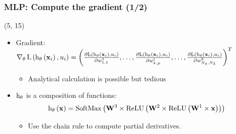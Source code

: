 \begin{frame}
  \frametitle{\acl{MLP}: Compute the gradient (1/2)}

  \begin{textblock}{90}(5, 15)
    \begin{itemize}
    \item Gradient:
      $
      \operatorname{\nabla}_{\mathbf{\theta}} \mathrm{L} \left ( {\mathrm{h}_{\mathbf{\theta}} \left ( {\mathbf{x}_i} \right ), u_i} \right ) =
      \left( \frac{\partial \mathrm{L} \left ( {\mathrm{h}_{\mathbf{\theta}} \left ( {\mathbf{x}_i} \right ), u_i} \right ) }{\partial w_{1,1}^1},\ldots,\frac{\partial \mathrm{L} \left ( {\mathrm{h}_{\mathbf{\theta}} \left ( {\mathbf{x}_i} \right ), u_i} \right ) }{\partial w_{k,p}^l},\ldots,\frac{\partial \mathrm{L} \left ( {\mathrm{h}_{\mathbf{\theta}} \left ( {\mathbf{x}_i} \right ), u_i} \right ) }{\partial w_{N_{4},N_{3}}^{3}} \right)^T
      $

      \begin{itemize}
      \item Analytical calculation is possible but tedious
      \end{itemize}
    \item $\mathrm{h}_{\mathbf{\theta}}$ is a composition of functions:
      \[
        \apply{\hyp_{\params}}{\example} = \apply{\softMaxFunc}{%
          \weightMatrix^3 \times
          \apply{\ReLUFunc}{%
            \weightMatrix^2 \times
            \apply{\ReLUFunc}{%
              \weightMatrix^1 \times \example
            }
          }
        }
      \]
      \begin{itemize}
      \item Use the chain rule to compute partial derivatives.
      \end{itemize}
    \end{itemize}
  \end{textblock}
\end{frame}

